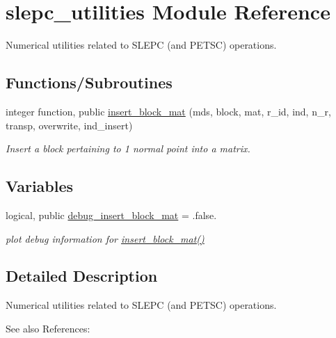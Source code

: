 \hypertarget{namespaceslepc__utilities}{}\section{slepc\+\_\+utilities Module Reference}
\label{namespaceslepc__utilities}


Numerical utilities related to S\+L\+E\+PC (and P\+E\+T\+SC) operations.  


\subsection*{Functions/\+Subroutines}
\begin{DoxyCompactItemize}
\item 
integer function, public \hyperlink{namespaceslepc__utilities_aa34aa361f0bfff9621ecba179f9ed0c6}{insert\+\_\+block\+\_\+mat} (mds, block, mat, r\+\_\+id, ind, n\+\_\+r, transp, overwrite, ind\+\_\+insert)
\begin{DoxyCompactList}\small\item\em Insert a block pertaining to 1 normal point into a matrix. \end{DoxyCompactList}\end{DoxyCompactItemize}
\subsection*{Variables}
\begin{DoxyCompactItemize}
\item 
logical, public \hyperlink{namespaceslepc__utilities_a5cb92553633cb22ff703286298862ac7}{debug\+\_\+insert\+\_\+block\+\_\+mat} = .false.
\begin{DoxyCompactList}\small\item\em plot debug information for \hyperlink{namespaceslepc__utilities_aa34aa361f0bfff9621ecba179f9ed0c6}{insert\+\_\+block\+\_\+mat()} \end{DoxyCompactList}\end{DoxyCompactItemize}


\subsection{Detailed Description}
Numerical utilities related to S\+L\+E\+PC (and P\+E\+T\+SC) operations. 

\begin{DoxySeeAlso}{See also}
References\+: \cite{Hernandez2005slepc} 
\end{DoxySeeAlso}



